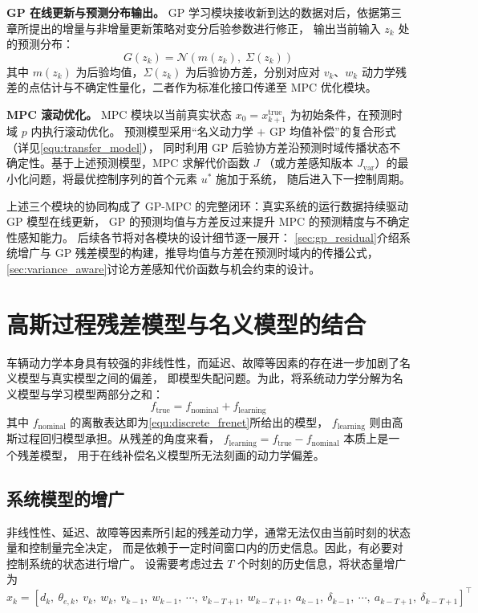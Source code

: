\textbf{GP 在线更新与预测分布输出。}
GP 学习模块接收新到达的数据对后，依据第三章所提出的增量与非增量更新策略对变分后验参数进行修正，
输出当前输入 $z_k$ 处的预测分布：
\begin{equation}
    G(z_k) = \mathcal{N}\!\left(m(z_k),\; \Sigma(z_k)\right)
\end{equation}
其中 $m(z_k)$ 为后验均值，$\Sigma(z_k)$ 为后验协方差，分别对应对 $v_k$、$w_k$
动力学残差的点估计与不确定性量化，二者作为标准化接口传递至 MPC 优化模块。

\textbf{MPC 滚动优化。}
MPC 模块以当前真实状态 $x_0 = x_{k+1}^{\mathrm{true}}$ 为初始条件，在预测时域 $p$ 内执行滚动优化。
预测模型采用``名义动力学 $+$ GP 均值补偿''的复合形式（详见\autoref{equ:transfer_model}），
同时利用 GP 后验协方差沿预测时域传播状态不确定性。基于上述预测模型，MPC 求解代价函数 $J$
（或方差感知版本 $J_{\mathrm{var}}$）的最小化问题，将最优控制序列的首个元素 $u^*$ 施加于系统，
随后进入下一控制周期。

上述三个模块的协同构成了 GP-MPC 的完整闭环：真实系统的运行数据持续驱动 GP 模型在线更新，
GP 的预测均值与方差反过来提升 MPC 的预测精度与不确定性感知能力。
后续各节将对各模块的设计细节逐一展开：
\autoref{sec:gp_residual}介绍系统增广与 GP 残差模型的构建，推导均值与方差在预测时域内的传播公式，
\autoref{sec:variance_aware}讨论方差感知代价函数与机会约束的设计。

\section{高斯过程残差模型与名义模型的结合}
\label{sec:gp_residual}

车辆动力学本身具有较强的非线性性，而延迟、故障等因素的存在进一步加剧了名义模型与真实模型之间的偏差，
即模型失配问题。为此，将系统动力学分解为名义模型与学习模型两部分之和：
\begin{equation}
    f_{\mathrm{true}} = f_{\mathrm{nominal}} + f_{\mathrm{learning}}
\end{equation}
其中 $f_{\mathrm{nominal}}$ 的离散表达即为\autoref{equ:discrete_frenet}所给出的模型，
$f_{\mathrm{learning}}$ 则由高斯过程回归模型承担。从残差的角度来看，
$f_{\mathrm{learning}} = f_{\mathrm{true}} - f_{\mathrm{nominal}}$ 本质上是一个残差模型，
用于在线补偿名义模型所无法刻画的动力学偏差。

\subsection{系统模型的增广}

非线性性、延迟、故障等因素所引起的残差动力学，通常无法仅由当前时刻的状态量和控制量完全决定，
而是依赖于一定时间窗口内的历史信息。因此，有必要对控制系统的状态进行增广。
设需要考虑过去 $T$ 个时刻的历史信息，将状态量增广为
\begin{equation} \label{equ:augmented_state}
    x_k = [d_k,\ \theta_{e,k},\ v_k,\ w_k,\ v_{k-1},\ w_{k-1},\ \cdots,\ 
    v_{k-T+1},\ w_{k-T+1},\ a_{k-1},\ \delta_{k-1},\ \cdots,\ 
    a_{k-T+1},\ \delta_{k-T+1}]^\top
\end{equation}

